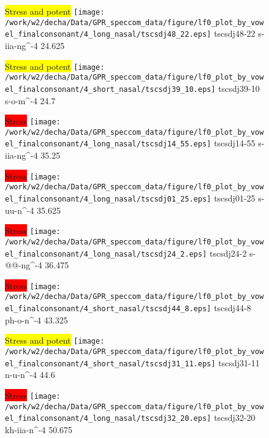 \documentclass{article}
\begin{document}
\begin{figure}[t]
\begin{minipage}[b]{.24\textwidth}
\colorbox{yellow}{Stress and potent}
\centering
\texttt{[image: /work/w2/decha/Data/GPR\_speccom\_data/figure/lf0\_plot\_by\_vowel\_finalconsonant/4\_long\_nasal/tscsdj48\_22.eps]}
tscsdj48-22 s-iia-ng\textasciicircum-4 24.625
\end{minipage}
\begin{minipage}[b]{.24\textwidth}
\colorbox{yellow}{Stress and potent}
\centering
\texttt{[image: /work/w2/decha/Data/GPR\_speccom\_data/figure/lf0\_plot\_by\_vowel\_finalconsonant/4\_short\_nasal/tscsdj39\_10.eps]}
tscsdj39-10 s-o-m\textasciicircum-4 24.7
\end{minipage}
\begin{minipage}[b]{.24\textwidth}
\colorbox{red}{Stress}
\centering
\texttt{[image: /work/w2/decha/Data/GPR\_speccom\_data/figure/lf0\_plot\_by\_vowel\_finalconsonant/4\_long\_nasal/tscsdj14\_55.eps]}
tscsdj14-55 s-iia-ng\textasciicircum-4 35.25
\end{minipage}
\begin{minipage}[b]{.24\textwidth}
\colorbox{red}{Stress}
\centering
\texttt{[image: /work/w2/decha/Data/GPR\_speccom\_data/figure/lf0\_plot\_by\_vowel\_finalconsonant/4\_long\_nasal/tscsdj01\_25.eps]}
tscsdj01-25 s-uu-n\textasciicircum-4 35.625
\end{minipage}
\end{figure}
\clearpage
\begin{figure}[t]
\begin{minipage}[b]{.24\textwidth}
\colorbox{red}{Stress}
\centering
\texttt{[image: /work/w2/decha/Data/GPR\_speccom\_data/figure/lf0\_plot\_by\_vowel\_finalconsonant/4\_long\_nasal/tscsdj24\_2.eps]}
tscsdj24-2 s-@@-ng\textasciicircum-4 36.475
\end{minipage}
\begin{minipage}[b]{.24\textwidth}
\colorbox{red}{Stress}
\centering
\texttt{[image: /work/w2/decha/Data/GPR\_speccom\_data/figure/lf0\_plot\_by\_vowel\_finalconsonant/4\_short\_nasal/tscsdj44\_8.eps]}
tscsdj44-8 ph-o-n\textasciicircum-4 43.325
\end{minipage}
\begin{minipage}[b]{.24\textwidth}
\colorbox{yellow}{Stress and potent}
\centering
\texttt{[image: /work/w2/decha/Data/GPR\_speccom\_data/figure/lf0\_plot\_by\_vowel\_finalconsonant/4\_short\_nasal/tscsdj31\_11.eps]}
tscsdj31-11 n-u-n\textasciicircum-4 44.6
\end{minipage}
\begin{minipage}[b]{.24\textwidth}
\colorbox{red}{Stress}
\centering
\texttt{[image: /work/w2/decha/Data/GPR\_speccom\_data/figure/lf0\_plot\_by\_vowel\_finalconsonant/4\_long\_nasal/tscsdj32\_20.eps]}
tscsdj32-20 kh-iia-n\textasciicircum-4 50.675
\end{minipage}
\end{figure}
\end{document}
